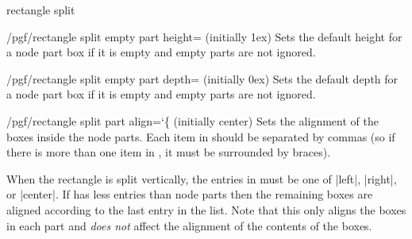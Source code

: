 \begin{shape}{rectangle split}
    \begin{key}{/pgf/rectangle split empty part height= (initially 1ex)}
        Sets the default height for a node part box if it is empty and empty
        parts are not ignored.
    \end{key}

    \begin{key}{/pgf/rectangle split empty part depth= (initially 0ex)}
        Sets the default depth for a node part box if it is empty and empty
        parts are not ignored.
    \end{key}

    \begin{key}{/pgf/rectangle split part align={\ttfamily\char`\{} (initially center)}
        Sets the alignment of the boxes inside the node parts. Each item in
         should be separated by commas (so if there is more than one
        item in , it must be surrounded by braces).

        When the rectangle is split vertically, the entries in  must
        be one of |left|, |right|, or |center|. If  has less entries
        than node parts then the remaining boxes are aligned according to the
        last entry in the list. Note that this only aligns the boxes in each
        part and \emph{does not} affect the alignment of the contents of the
        boxes.
\begin{codeexample}[preamble={\usetikzlibrary{shapes.multipart}}]
\def\x{one \nodepart{two} 2 \nodepart{three} three \nodepart{four} 4}
\end{codeexample}


\end{key}
\end{shape}

